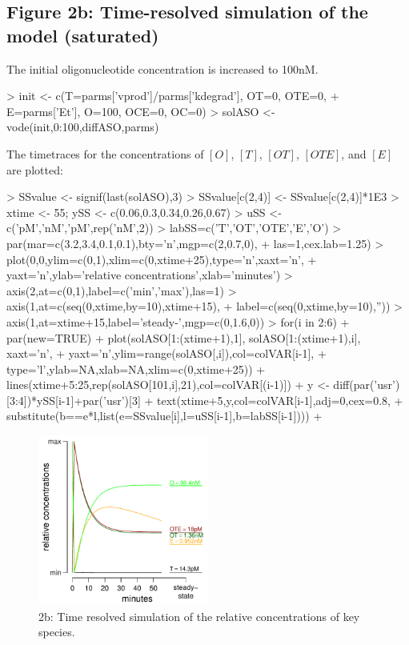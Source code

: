 \documentclass{article}
\newenvironment{Ncenter}{%
  \setlength\topsep{-10pt}
  \setlength\parskip{-100pt}
  \begin{center}
}{%
  \end{center}
}
\begin{document}
\subsection*{Figure 2b: Time-resolved simulation of the model (saturated)}
The initial oligonucleotide concentration is increased to 100nM.
\begin{Schunk}
\begin{Sinput}
> init <- c(T=parms['vprod']/parms['kdegrad'], OT=0, OTE=0, 
+           E=parms['Et'], O=100, OCE=0, OC=0)
> solASO <- vode(init,0:100,diffASO,parms)
\end{Sinput}
\end{Schunk}
The timetraces for the concentrations of $[O]$, $[T]$, $[OT]$, $[OTE]$, and $[E]$ are plotted:
\begin{Schunk}
\begin{Sinput}
> SSvalue <- signif(last(solASO),3)
> SSvalue[c(2,4)] <- SSvalue[c(2,4)]*1E3
> xtime <- 55; ySS <- c(0.06,0.3,0.34,0.26,0.67)
> uSS <- c('pM','nM','pM',rep('nM',2)) 
> labSS=c('T','OT','OTE','E','O')
> par(mar=c(3.2,3.4,0.1,0.1),bty='n',mgp=c(2,0.7,0),
+     las=1,cex.lab=1.25)
> plot(0,0,ylim=c(0,1),xlim=c(0,xtime+25),type='n',xaxt='n',
+      yaxt='n',ylab='relative concentrations',xlab='minutes')
> axis(2,at=c(0,1),label=c('min','max'),las=1)
> axis(1,at=c(seq(0,xtime,by=10),xtime+15),
+      label=c(seq(0,xtime,by=10),''))
> axis(1,at=xtime+15,label='steady-\nstate',mgp=c(0,1.6,0))
> for(i in 2:6){ 
+   par(new=TRUE)
+   plot(solASO[1:(xtime+1),1], solASO[1:(xtime+1),i], xaxt='n',
+        yaxt='n',ylim=range(solASO[,i]),col=colVAR[i-1], 
+        type='l',ylab=NA,xlab=NA,xlim=c(0,xtime+25)) 
+   lines(xtime+5:25,rep(solASO[101,i],21),col=colVAR[(i-1)]) 
+   y <- diff(par('usr')[3:4])*ySS[i-1]+par('usr')[3]
+   text(xtime+5,y,col=colVAR[i-1],adj=0,cex=0.8,
+        substitute(b==e*l,list(e=SSvalue[i],l=uSS[i-1],b=labSS[i-1])))
+ }
\end{Sinput}
\end{Schunk}
\begin{figure}[!h]
\begin{Ncenter}
\includegraphics[width=0.5\textwidth]{Vignette2-Figb}
\end{Ncenter}
\caption{2b: Time resolved simulation of the relative concentrations of key species.}
\end{figure}
\newpage
\end{document}
